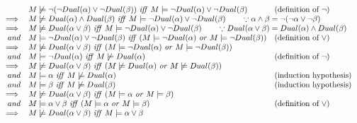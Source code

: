 \documentclass{article}
\begin{document}
\begin{enumerate}
\[\begin{array}{rll}
   & M \not\models \neg(\neg Dual(\alpha)\lor \neg Dual(\beta))\ \mathit{iff}\ M \models \neg Dual(\alpha)\lor \neg Dual(\beta)  & \text{(definition of \(\neg\))}\\
 \implies & \multicolumn{2}{l}{M \not\models Dual(\alpha)\land Dual(\beta)\ \mathit{iff}\ M \models \neg Dual(\alpha)\lor \neg Dual(\beta) \qquad \because \alpha\land\beta = \neg (\neg\alpha \lor \neg\beta)}\\
 \implies & \multicolumn{2}{l}{M \not\models Dual(\alpha\lor\beta)\ \mathit{iff}\ M \models \neg Dual(\alpha)\lor \neg Dual(\beta) \qquad \because Dual(\alpha\lor\beta) = Dual(\alpha)\land Dual(\beta)}\\
 and & M \models \neg Dual(\alpha)\lor \neg Dual(\beta)\ \mathit{iff}\ (M \models \neg Dual(\alpha) \ \mathit{or}\ M \models \neg Dual(\beta)) & \text{(definition of \(\lor\))}\\
 \implies & M \not\models Dual(\alpha\lor\beta)\ \mathit{iff}\ (M \models \neg Dual(\alpha) \ \mathit{or}\ M \models \neg Dual(\beta)) \\
 and & M \models \neg Dual(\alpha) \ \mathit{iff}\ M \not\models Dual(\alpha) & \text{(definition of \(\neg\))}\\
 \implies & M \not\models Dual(\alpha\lor\beta)\ \mathit{iff}\ (M \not\models Dual(\alpha) \ \mathit{or}\ M \not\models Dual(\beta)) \\
 and & M \models \alpha\ \mathit{iff}\ M \not\models Dual(\alpha) & \text{(induction hypothesis)}\\
 and & M \models \beta \ \mathit{iff}\ M \not\models Dual(\beta)  & \text{(induction hypothesis)}\\
 \implies & M \not\models Dual(\alpha\lor\beta)\ \mathit{iff}\ (M \models \alpha \ \mathit{or}\ M \models \beta) \\
 and & M \models \alpha\lor\beta\ \mathit{iff}\ (M \models \alpha \ \mathit{or}\ M \models \beta) & \text{(definition of \(\lor\))}\\
 \implies & M \not\models Dual(\alpha\lor\beta)\ \mathit{iff}\ M \models \alpha\lor\beta \\
\end{array}
\]


\end{enumerate}
\end{document}
